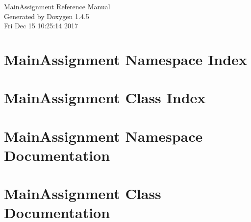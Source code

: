 \documentclass[a4paper]{book}
\begin{document}
\begin{titlepage}
\vspace*{7cm}
\begin{center}
{\Large Main\-Assignment Reference Manual}\\
\vspace*{1cm}
{\large Generated by Doxygen 1.4.5}\\
\vspace*{0.5cm}
{\small Fri Dec 15 10:25:14 2017}\\
\end{center}
\end{titlepage}
\clearemptydoublepage
{}
\tableofcontents
\clearemptydoublepage
{}
\chapter{Main\-Assignment Namespace Index}

\chapter{Main\-Assignment Class Index}

\chapter{Main\-Assignment Namespace Documentation}

\chapter{Main\-Assignment Class Documentation}












\printindex
\end{document}
